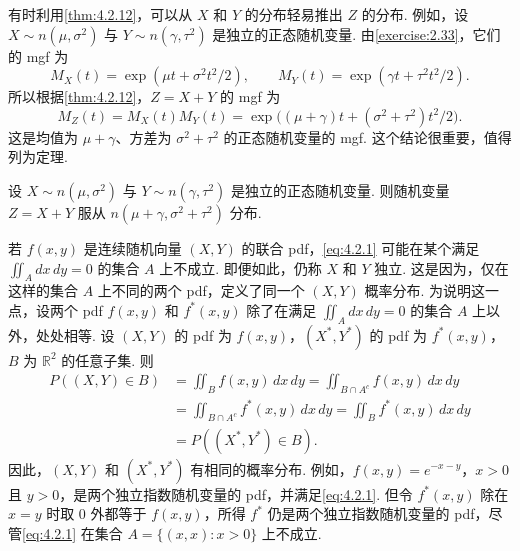 \begin{example}\label{ex:4.2.13}
有时利用\autoref{thm:4.2.12}，可以从 $X$ 和 $Y$ 的分布轻易推出 $Z$ 的分布. 例如，设 $X\sim n(\mu,\sigma^2)$ 与 $Y\sim n(\gamma,\tau^2)$ 是独立的正态随机变量. 由\autoref{exercise:2.33}，它们的 mgf 为
$$M_X(t)=\exp(\mu t+\sigma^2t^2/2),\qquad M_Y(t)=\exp(\gamma t+\tau^2t^2/2).$$
所以根据\autoref{thm:4.2.12}，$Z=X+Y$ 的 mgf 为
$$M_Z(t)=M_X(t)M_Y(t)=\exp\bigl((\mu+\gamma)t+(\sigma^2+\tau^2)t^2/2\bigr).$$
这是均值为 $\mu+\gamma$、方差为 $\sigma^2+\tau^2$ 的正态随机变量的 mgf. 这个结论很重要，值得列为定理.
\end{example}
\begin{theorem}\label{thm:4.2.14}
设 $X\sim n(\mu,\sigma^2)$ 与 $Y\sim n(\gamma,\tau^2)$ 是独立的正态随机变量. 则随机变量 $Z=X+Y$ 服从 $n(\mu+\gamma,\sigma^2+\tau^2)$ 分布.
\end{theorem}

若 $f(x,y)$ 是连续随机向量 $(X,Y)$ 的联合 pdf，\eqref{eq:4.2.1} 可能在某个满足 $\iint_A dx\,dy=0$ 的集合 $A$ 上不成立. 即便如此，仍称 $X$ 和 $Y$ 独立. 这是因为，仅在这样的集合 $A$ 上不同的两个 pdf，定义了同一个 $(X,Y)$ 概率分布. 为说明这一点，设两个 pdf $f(x,y)$ 和 $f^*(x,y)$ 除了在满足 $\iint_A dx\,dy=0$ 的集合 $A$ 上以外，处处相等. 设 $(X,Y)$ 的 pdf 为 $f(x,y)$，$(X^*,Y^*)$ 的 pdf 为 $f^*(x,y)$，$B$ 为 $\mathbb R^2$ 的任意子集. 则
$$
\begin{aligned}
P((X,Y)\in B)&=\iint_B f(x,y)\,dx\,dy=\iint_{B\cap A^c}f(x,y)\,dx\,dy\\
&=\iint_{B\cap A^c}f^*(x,y)\,dx\,dy=\iint_B f^*(x,y)\,dx\,dy\\
&=P((X^*,Y^*)\in B).
\end{aligned}
$$
因此，$(X,Y)$ 和 $(X^*,Y^*)$ 有相同的概率分布. 例如，$f(x,y)=e^{-x-y}$，$x>0$ 且 $y>0$，是两个独立指数随机变量的 pdf，并满足\eqref{eq:4.2.1}. 但令 $f^*(x,y)$ 除在 $x=y$ 时取 0 外都等于 $f(x,y)$，所得 $f^*$ 仍是两个独立指数随机变量的 pdf，尽管\eqref{eq:4.2.1} 在集合 $A=\{(x,x):x>0\}$ 上不成立.
